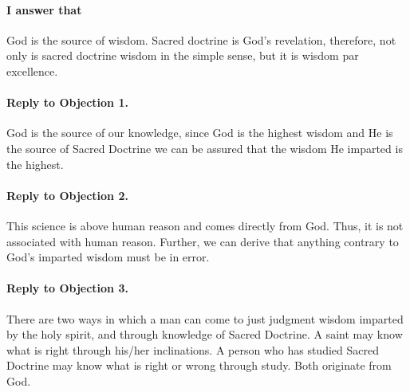 \documentclass{ucetd}
\begin{document}
\paragraph{I answer that}
God is the source of wisdom. Sacred doctrine is God's revelation, therefore, not only is sacred doctrine wisdom in the simple sense, but it is wisdom par excellence.
\paragraph{Reply to Objection 1.}
God is the source of our knowledge, since God is the highest wisdom and He is the source of Sacred Doctrine we can be assured that the wisdom He imparted is the highest.
\paragraph{Reply to Objection 2.}
This science is above human reason and comes directly from God. Thus, it is not associated with human reason. Further, we can derive that anything contrary to God's imparted wisdom must be in error.
\paragraph{Reply to Objection 3.}
There are two ways in which a man can come to just judgment wisdom imparted by the holy spirit, and through knowledge of Sacred Doctrine.
A saint may know what is right through his/her inclinations. A person who has studied Sacred Doctrine may know what is right or wrong through study. Both originate from God.
\end{document}
